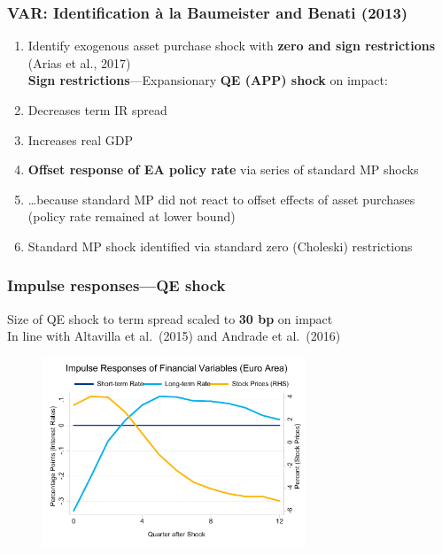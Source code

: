 \documentclass[pdflatex,aspectratio=169]{beamer}
\newcommand{\jbemph}[1]{\textbf{\color{SlideNavy}#1}}
\begin{document}
\begin{frame}\frametitle{\bf\large VAR: Identification \`a la Baumeister and Benati (2013)}
\begin{enumerate}
\setlength{\itemsep}{2mm}
\item Identify exogenous asset purchase shock with \jbemph{zero and sign restrictions} (Arias et al., 2017)\\[2mm]
\jbemph{Sign restrictions}---Expansionary \jbemph{QE (APP) shock} on impact:
\bi
\item Decreases term IR spread
\item Increases real GDP
\ei
\item \jbemph{Offset response of EA policy rate} via series of standard MP shocks
\bi
\item \dots because standard MP did not react to offset effects of asset purchases (policy rate remained at lower bound)
\ei
\item Standard MP shock identified via standard zero (Choleski) restrictions
\end{enumerate}

\end{frame}



\begin{frame}\frametitle{\bf Impulse responses---QE shock}
\bi
\item Size of QE shock to term spread scaled to \jbemph{30 bp} on impact\\
In line with Altavilla et al.\ (2015) and Andrade et al.\ (2016)
\ei
\begin{figure}
\begin{center}
\includegraphics[width=0.7\textwidth]{./figures/irf_fin} %
\end{center}
\end{figure}

\end{frame}
\end{document}
